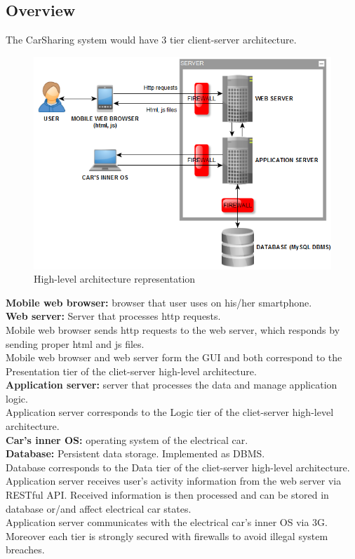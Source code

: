 \documentclass[12pt, letterpaper]{article}
\begin{document}
\subsection{Overview}

The CarSharing system would have 3 tier client-server architecture. 

\begin{figure}[h]
\centering
\includegraphics[width=\textwidth]{hlarch.png}
\caption{High-level architecture representation}
\label{fig:hlarch}
\end{figure}

\textbf{Mobile web browser:} browser that user uses on his/her smartphone. \\ 
\textbf{Web server:} Server that processes http requests. \\
Mobile web browser sends http requests to the web server, which responds by sending proper html and js files. \\
Mobile web browser and web server form the GUI and both correspond to the Presentation tier of the cliet-server high-level architecture. \\
\vspace{0.5cm}
\textbf{Application server:} server that processes the data and manage application logic. \\ 
Application server corresponds to the Logic tier of the cliet-server high-level architecture. \\
\vspace{0.5cm}
\textbf{Car's inner OS:} operating system of the electrical car. \\ 
\textbf{Database:} Persistent data storage. Implemented as DBMS. \\
Database corresponds to the Data tier of the cliet-server high-level architecture. \\
\vspace{0.5cm}
Application server receives user's activity information from the web server via RESTful API. Received information is then processed and can be stored in database or/and affect electrical car states. \\
Application server communicates with the electrical car's inner OS via 3G.\\
\vspace{0.5cm}
Moreover each tier is strongly secured with firewalls to avoid illegal system breaches.
\end{document}
